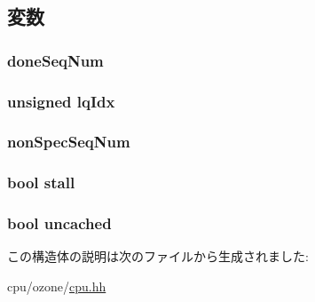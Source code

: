 \subsection{変数}
\hypertarget{structOzoneCPU_1_1CommStruct_a45920c1d79a22b1320274c5f53504654}{
\subsubsection[{doneSeqNum}]{ {\bf doneSeqNum}}}
\label{structOzoneCPU_1_1CommStruct_a45920c1d79a22b1320274c5f53504654}
\hypertarget{structOzoneCPU_1_1CommStruct_a76af8a7e5552d224f4a533370ebdf9e9}{
\subsubsection[{lqIdx}]{\setlength{\rightskip}{0pt plus 5cm}unsigned {\bf lqIdx}}}
\label{structOzoneCPU_1_1CommStruct_a76af8a7e5552d224f4a533370ebdf9e9}
\hypertarget{structOzoneCPU_1_1CommStruct_a2109aaf648ce5c87f53ac688b4e51db1}{
\subsubsection[{nonSpecSeqNum}]{ {\bf nonSpecSeqNum}}}
\label{structOzoneCPU_1_1CommStruct_a2109aaf648ce5c87f53ac688b4e51db1}
\hypertarget{structOzoneCPU_1_1CommStruct_a8b9d194898424469999ed72a43cfd488}{
\subsubsection[{stall}]{\setlength{\rightskip}{0pt plus 5cm}bool {\bf stall}}}
\label{structOzoneCPU_1_1CommStruct_a8b9d194898424469999ed72a43cfd488}
\hypertarget{structOzoneCPU_1_1CommStruct_aab896ca9f63476ee85c0cac2bbff0811}{
\subsubsection[{uncached}]{\setlength{\rightskip}{0pt plus 5cm}bool {\bf uncached}}}
\label{structOzoneCPU_1_1CommStruct_aab896ca9f63476ee85c0cac2bbff0811}


この構造体の説明は次のファイルから生成されました:\begin{DoxyCompactItemize}
\item 
cpu/ozone/\hyperlink{ozone_2cpu_8hh}{cpu.hh}\end{DoxyCompactItemize}
